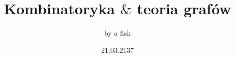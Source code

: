\documentclass{article}[13pt]
\title {Kombinatoryka $\&$ teoria grafów}
\author{by a fish}
\date {21.03.2137}
\begin{document}
\maketitle

\newpage

\begin{center}

\end{center}

\newpage
\end{document}
